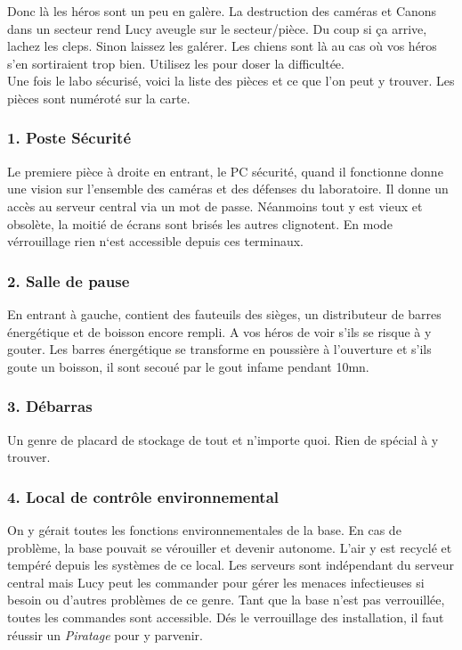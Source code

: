 Donc là les héros sont un peu en galère. La destruction des caméras et Canons dans un secteur rend Lucy aveugle sur le secteur/pièce. Du coup si ça arrive, lachez les cleps. Sinon laissez les galérer. Les chiens sont là au cas où vos héros s’en sortiraient trop bien. Utilisez les pour doser la difficultée.\\

Une fois le labo sécurisé, voici la liste des pièces et ce que l’on peut y trouver. Les pièces sont numéroté sur la carte.

\subsubsection{1. Poste Sécurité}
Le premiere pièce à droite en entrant, le PC sécurité, quand il fonctionne donne une vision sur l’ensemble des caméras et des défenses du laboratoire. Il donne un accès au serveur central via un mot de passe. Néanmoins tout y est vieux et obsolète, la moitié de écrans sont brisés les autres clignotent. En mode vérrouillage rien n`est accessible depuis ces terminaux.

\subsubsection{2. Salle de pause}
En entrant à gauche, contient des fauteuils des sièges, un distributeur de barres énergétique et de boisson encore rempli. A vos héros de voir s'ils se risque à y gouter. Les barres énergétique se transforme en poussière à l’ouverture et s’ils goute un boisson, il sont secoué par le gout infame pendant 10mn.

\subsubsection{3. Débarras}
Un genre de placard de stockage de tout et n’importe quoi. Rien de spécial à y trouver.

\subsubsection{4. Local de contrôle environnemental}
On y gérait toutes les fonctions environnementales de la base. En cas de problème, la base pouvait se vérouiller et devenir autonome. L’air y est recyclé et tempéré depuis les systèmes de ce local. Les serveurs sont indépendant du serveur central mais Lucy peut les commander pour gérer les menaces infectieuses si besoin ou d’autres problèmes de ce genre. Tant que la base n’est pas verrouillée, toutes les commandes sont accessible. Dés le verrouillage des installation, il faut réussir un \textit{Piratage} pour y parvenir.

